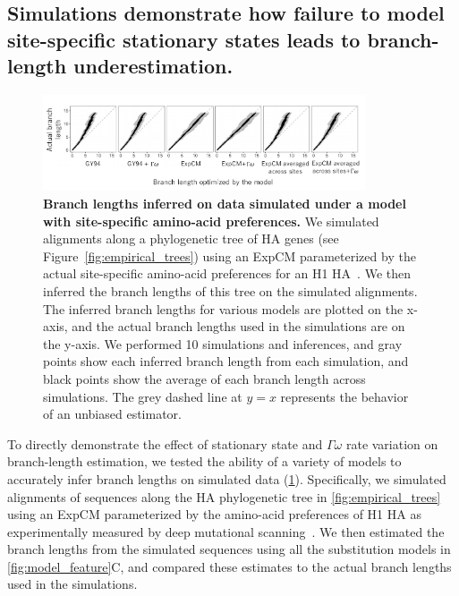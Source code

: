 \documentclass[11pt]{article}
\begin{document}
\subsection*{Simulations demonstrate how failure to model site-specific stationary states leads to branch-length underestimation.}

\begin{figure}
\centerline{\includegraphics[width=0.85\textwidth]{figures/simulations}}
\caption{\label{fig:simulations}
\textbf{Branch lengths inferred on data simulated under a model with site-specific amino-acid preferences.} 
We simulated alignments along a phylogenetic tree of HA genes (see Figure~\ref{fig:empirical_trees}) using an ExpCM parameterized by the actual site-specific amino-acid preferences for an H1 HA~\citep{doud2016accurate}.
We then inferred the branch lengths of this tree on the simulated alignments.
The inferred branch lengths for various models are plotted on the x-axis, and the actual branch lengths used in the simulations are on the y-axis.
We performed 10 simulations and inferences, and gray points show each inferred branch length from each simulation, and black points show the average of each branch length across simulations.
The grey dashed line at $y=x$ represents the behavior of an unbiased estimator. 
}
\end{figure}

To directly demonstrate the effect of stationary state and $\Gamma\omega$ rate variation on branch-length estimation, we tested the ability of a variety of models to accurately infer branch lengths on simulated data (\ref{fig:simulations}).
Specifically, we simulated alignments of sequences along the HA phylogenetic tree in \ref{fig:empirical_trees} using an ExpCM parameterized by the amino-acid preferences of H1 HA as experimentally measured by deep mutational scanning~\citep{doud2016accurate}. We then estimated the branch lengths from the simulated sequences using all the substitution models in \ref{fig:model_feature}C, and compared these estimates to the actual branch lengths used in the simulations.
\end{document}
